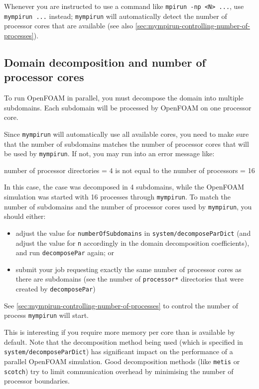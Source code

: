 Whenever you are instructed to use a command like \lstinline|mpirun -np <N> ...|,
use \lstinline|mympirun ...| instead; \lstinline|mympirun| will automatically detect the number of
processor cores that are available (see also \autoref{sec:mympirun-controlling-number-of-processes}).

\subsection{Domain decomposition and number of processor cores}
\label{sec:best-practices-openfoam-domain-decomposition-processor-cores}

To run OpenFOAM in parallel, you must decompose the domain into multiple subdomains.
Each subdomain will be processed by OpenFOAM on one processor core.

Since \lstinline|mympirun| will automatically use all available cores, you need to make sure
that the number of subdomains matches the number of processor cores that will be used by \lstinline|mympirun|.
If not, you may run into an error message like:

\begin{prompt}
number of processor directories = 4 is not equal to the number of processors = 16
\end{prompt}

In this case, the case was decomposed in 4 subdomains, while the OpenFOAM simulation was started with 16 processes
through \lstinline|mympirun|.
To match the number of subdomains and the number of processor cores used by \lstinline|mympirun|,
you should either:

\begin{itemize}
\item adjust the value for \lstinline|numberOfSubdomains| in \lstinline|system/decomposeParDict|
    (and adjust the value for \lstinline|n| accordingly in the domain decomposition coefficients),
    and run \lstinline|decomposePar| again; or
\item submit your job requesting exactly the same number of processor cores as there are subdomains (see the
    number of \lstinline|processor*| directories that were created by \lstinline|decomposePar|)
\end{itemize}

See \autoref{sec:mympirun-controlling-number-of-processes} to control the number of process \lstinline|mympirun| will start.

This is interesting if you require more memory per core than is available by default.
Note that the decomposition method being used (which is specified in \lstinline|system/decomposeParDict|)
has significant impact on the performance of a parallel OpenFOAM simulation. Good decomposition methods (like
\lstinline|metis| or \lstinline|scotch|) try to limit communication overhead by minimising the number
of processor boundaries.


